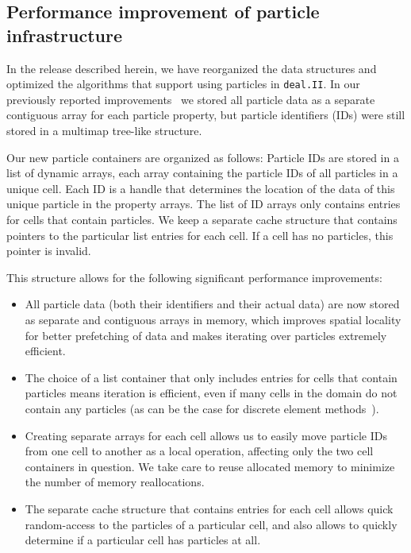 \documentclass{ansarticle-preprint}
\newcommand{\specialword}[1]{\texttt{#1}}
\newcommand{\dealii}{{\specialword{deal.II}}\xspace}
\begin{document}
\subsection{Performance improvement of particle infrastructure}\label{sec:particles}

In the release described herein, we have reorganized the data
structures and optimized the algorithms that support using particles
in \dealii{}. In our previously reported improvements~\citep{dealII93} we stored all particle data as a separate contiguous array for each particle property, but particle identifiers (IDs) were still stored in a multimap tree-like structure.

Our new particle containers are organized as follows: Particle IDs are stored in a list of dynamic arrays, each array containing the particle IDs of all particles in a unique cell. Each ID is a handle that determines the location of the data of this unique particle in the property arrays.
The list of ID arrays only contains entries for cells that contain particles. We keep a separate cache structure that contains pointers to the particular list entries for each cell. If a cell has no particles, this pointer is invalid.

This structure allows for the following significant performance improvements:

\begin{itemize}
\item All particle data (both their identifiers and their actual data) are now stored as separate and contiguous arrays in memory, which improves spatial locality for better prefetching of data and makes iterating over particles extremely efficient.
\item The choice of a list container that only includes entries for cells that contain particles means iteration is efficient, even if many cells in the domain do not contain any particles (as can be the case for discrete element methods~\cite{golshan2022lethe}).
\item Creating separate arrays for each cell allows us to easily move particle IDs from one cell to another as a local operation, affecting only the two cell containers in question. We take care to reuse allocated memory to minimize the number of memory reallocations.
\item The separate cache structure that contains entries for each cell allows quick random-access to the particles of a particular cell, and also allows to quickly determine if a particular cell has particles at all.
\end{itemize}
\end{document}
